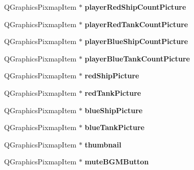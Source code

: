 \begin{DoxyCompactItemize}
\item 
Q\+Graphics\+Pixmap\+Item $\ast$ {\bfseries player\+Red\+Ship\+Count\+Picture}\hypertarget{class_game_menu_a930dfe40b7944b923cba0573a1ac2e55}{}\label{class_game_menu_a930dfe40b7944b923cba0573a1ac2e55}

\item 
Q\+Graphics\+Pixmap\+Item $\ast$ {\bfseries player\+Red\+Tank\+Count\+Picture}\hypertarget{class_game_menu_a5e1eaab4a213cf591a8f795170385cec}{}\label{class_game_menu_a5e1eaab4a213cf591a8f795170385cec}

\item 
Q\+Graphics\+Pixmap\+Item $\ast$ {\bfseries player\+Blue\+Ship\+Count\+Picture}\hypertarget{class_game_menu_a7ed3930e5a8f355cd35a71324b83623f}{}\label{class_game_menu_a7ed3930e5a8f355cd35a71324b83623f}

\item 
Q\+Graphics\+Pixmap\+Item $\ast$ {\bfseries player\+Blue\+Tank\+Count\+Picture}\hypertarget{class_game_menu_a29de28479797b06dfe7dd9b45d5f028d}{}\label{class_game_menu_a29de28479797b06dfe7dd9b45d5f028d}

\item 
Q\+Graphics\+Pixmap\+Item $\ast$ {\bfseries red\+Ship\+Picture}\hypertarget{class_game_menu_ae84c38f6ebfb2e3ff1706cbc68486664}{}\label{class_game_menu_ae84c38f6ebfb2e3ff1706cbc68486664}

\item 
Q\+Graphics\+Pixmap\+Item $\ast$ {\bfseries red\+Tank\+Picture}\hypertarget{class_game_menu_a45bc69ba75f458e21d7f3a1ea63dd666}{}\label{class_game_menu_a45bc69ba75f458e21d7f3a1ea63dd666}

\item 
Q\+Graphics\+Pixmap\+Item $\ast$ {\bfseries blue\+Ship\+Picture}\hypertarget{class_game_menu_ad46b5b1b90f4d0ce99790c8bc9d7832c}{}\label{class_game_menu_ad46b5b1b90f4d0ce99790c8bc9d7832c}

\item 
Q\+Graphics\+Pixmap\+Item $\ast$ {\bfseries blue\+Tank\+Picture}\hypertarget{class_game_menu_af70e2733344a7eeb1678c2666e3eb164}{}\label{class_game_menu_af70e2733344a7eeb1678c2666e3eb164}

\item 
Q\+Graphics\+Pixmap\+Item $\ast$ {\bfseries thumbnail}\hypertarget{class_game_menu_ab8ec0b01e303715a988e5e51cccb14de}{}\label{class_game_menu_ab8ec0b01e303715a988e5e51cccb14de}

\item 
Q\+Graphics\+Pixmap\+Item $\ast$ {\bfseries mute\+B\+G\+M\+Button}\hypertarget{class_game_menu_aaf654b46140ebb546578a3fefd72934c}{}\label{class_game_menu_aaf654b46140ebb546578a3fefd72934c}


\end{DoxyCompactItemize}
